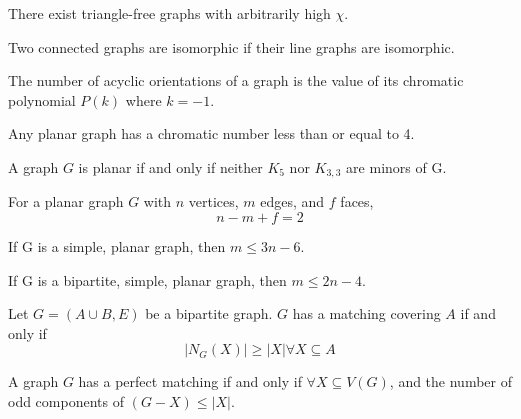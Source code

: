 \begin{theorem}
    There exist triangle-free graphs with arbitrarily high $\chi$.
\end{theorem}

\begin{theorem}
    Two connected graphs are isomorphic if their line graphs are isomorphic.
\end{theorem}

\begin{theorem}
    The number of acyclic orientations of a graph is the value of its chromatic polynomial $P(k)$ where $k=-1$.
\end{theorem}

\begin{theorem}
    Any planar graph has a chromatic number less than or equal to 4.
\end{theorem}


\begin{theorem}
    A graph $G$ is planar if and only if neither $K_5$ nor $K_{3,3}$ are minors of G.
\end{theorem}

\begin{theorem}
    For a planar graph $G$ with $n$ vertices, $m$ edges, and $f$ faces, \[n-m+f=2\]
\end{theorem}

\begin{theorem}
    If G is a simple, planar graph, then $m\leq3n-6$.
\end{theorem}

\begin{theorem}
    If G is a bipartite, simple, planar graph, then $m\leq2n-4$.
\end{theorem}



\begin{theorem}
    Let $G=(A\cup B, E)$ be a bipartite graph. $G$ has a matching covering $A$ if and only if \[|N_G(X)|\geq|X|\forall X\subseteq A\]
\end{theorem}

\begin{theorem}
    A graph $G$ has a perfect matching if and only if $\forall X\subseteq V(G)$, and the number of odd components of $(G-X)\leq|X|$.
\end{theorem}

